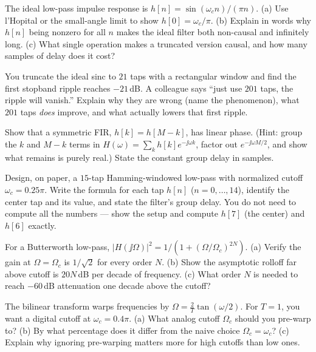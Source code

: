 \begin{exercise}
The ideal low-pass impulse response is $h[n] = \sin(\omega_c n)/(\pi n)$. (a) Use
l'Hopital or the small-angle limit to show $h[0] = \omega_c/\pi$. (b) Explain in
words why $h[n]$ being nonzero for all $n$ makes the ideal filter both non-causal
and infinitely long. (c) What single operation makes a truncated version causal,
and how many samples of delay does it cost?
\end{exercise}

\begin{exercise}
You truncate the ideal sinc to $21$ taps with a rectangular window and find the
first stopband ripple reaches $-21$\,dB. A colleague says ``just use $201$ taps,
the ripple will vanish.'' Explain why they are wrong (name the phenomenon), what
$201$ taps \emph{does} improve, and what actually lowers that first ripple.
\end{exercise}

\begin{exercise}
Show that a symmetric FIR, $h[k] = h[M-k]$, has linear phase. (Hint: group the
$k$ and $M-k$ terms in $H(\omega) = \sum_k h[k] e^{-\jj\omega k}$, factor out
$e^{-\jj\omega M/2}$, and show what remains is purely real.) State the constant
group delay in samples.
\end{exercise}

\begin{exercise}
Design, on paper, a $15$-tap Hamming-windowed low-pass with normalized cutoff
$\omega_c = 0.25\pi$. Write the formula for each tap $h[n]$ ($n=0,\dots,14$),
identify the center tap and its value, and state the filter's group delay. You do
not need to compute all the numbers --- show the setup and compute $h[7]$ (the
center) and $h[6]$ exactly.
\end{exercise}

\begin{exercise}
For a Butterworth low-pass, $|H(\jj\Omega)|^2 = 1/(1+(\Omega/\Omega_c)^{2N})$.
(a) Verify the gain at $\Omega = \Omega_c$ is $1/\sqrt2$ for every order $N$.
(b) Show the asymptotic rolloff far above cutoff is $20N$\,dB per decade of
frequency. (c) What order $N$ is needed to reach $-60$\,dB attenuation one decade
above the cutoff?
\end{exercise}

\begin{exercise}
The bilinear transform warps frequencies by $\Omega = \tfrac{2}{T}\tan(\omega/2)$.
For $T=1$, you want a digital cutoff at $\omega_c = 0.4\pi$. (a) What analog cutoff
$\Omega_c$ should you pre-warp to? (b) By what percentage does it differ from the
naive choice $\Omega_c = \omega_c$? (c) Explain why ignoring pre-warping matters
more for high cutoffs than low ones.
\end{exercise}

